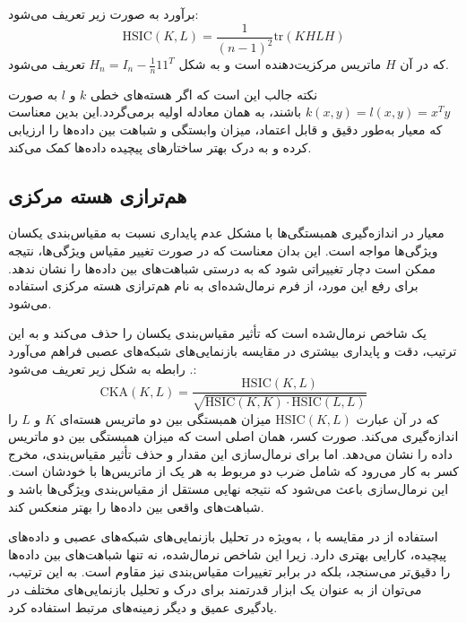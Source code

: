 برآورد
به صورت زیر تعریف می‌شود:
\begin{equation}
	\text{HSIC}(K, L) = \frac{1}{(n - 1)^2} \text{tr}(KHLH)
	\label{eq_HSIC}
\end{equation}
که در آن
\(H\)
ماتریس مرکزیت‌دهنده است و به شکل \(H_n = I_n - \frac{1}{n} 11^T\) تعریف می‌شود.

نکته جالب این است که اگر هسته‌های خطی \(k\) و \(l\) به صورت \(k(x, y) = l(x, y) = x^Ty\) باشند،
به همان معادله اولیه برمی‌گردد.این بدین معناست که معیار 
به‌طور دقیق و قابل اعتماد، میزان وابستگی و شباهت بین داده‌ها را ارزیابی کرده و به درک بهتر ساختارهای پیچیده داده‌ها کمک می‌کند.


\subsection{
	هم‌ترازی هسته مرکزی%
}
معیار
در اندازه‌گیری همبستگی‌ها با مشکل عدم پایداری نسبت به مقیاس‌بندی یکسان ویژگی‌ها مواجه است. این بدان معناست که در صورت تغییر مقیاس ویژگی‌ها، نتیجه
ممکن است دچار تغییراتی شود که به درستی شباهت‌های بین داده‌ها را نشان ندهد. برای رفع این مورد، از فرم نرمال‌شده‌ای به نام هم‌ترازی هسته مرکزی استفاده می‌شود.

یک شاخص نرمال‌شده است که تأثیر مقیاس‌بندی یکسان را حذف می‌کند و به این ترتیب، دقت و پایداری بیشتری در مقایسه بازنمایی‌های شبکه‌های عصبی فراهم می‌آورد
\cite{cortes2012algorithms, cristianini2001kernel}.
رابطه
به شکل زیر تعریف می‌شود:
\begin{equation}
	\text{CKA}(K, L) = \frac{\text{HSIC}(K, L)}{\sqrt{\text{HSIC}(K, K) \cdot \text{HSIC}(L, L)}}
	\label{eq_CKA}
\end{equation}
که در آن عبارت \(\text{HSIC}(K, L)\) میزان همبستگی بین دو ماتریس هسته‌ای \(K\) و \(L\) را اندازه‌گیری می‌کند. صورت کسر، همان
اصلی است که میزان همبستگی بین دو ماتریس داده را نشان می‌دهد. اما برای نرمال‌سازی این مقدار و حذف تأثیر مقیاس‌بندی، مخرج کسر به کار می‌رود که شامل ضرب دو
مربوط به هر یک از ماتریس‌ها با خودشان است. این نرمال‌سازی باعث می‌شود که نتیجه نهایی مستقل از مقیاس‌بندی ویژگی‌ها باشد و شباهت‌های واقعی بین داده‌ها را بهتر منعکس کند.

استفاده از
در مقایسه با
%
، به‌ویژه در تحلیل بازنمایی‌های شبکه‌های عصبی و داده‌های پیچیده، کارایی بهتری دارد. زیرا این شاخص نرمال‌شده، نه تنها شباهت‌های بین داده‌ها را دقیق‌تر می‌سنجد، بلکه در برابر تغییرات مقیاس‌بندی نیز مقاوم است. به این ترتیب، می‌توان از
به عنوان یک ابزار قدرتمند برای درک و تحلیل بازنمایی‌های مختلف در یادگیری عمیق و دیگر زمینه‌های مرتبط استفاده کرد.




